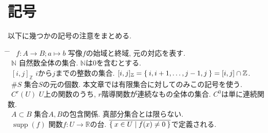 \documentclass{jsarticle}
\newcommand\setN{\mathbb{N}}
\newcommand\setZ{\mathbb{Z}}
\newcommand\setR{\mathbb{R}}
\newcommand\Cl[1]{\overline{#1}}
\newcommand\squa[1]{[#1]}
\newcommand\Squa[1]{\left[#1\right]}
\newcommand\Z[2]{\squa{#1,#2}_\mathbb{Z}}
\DeclareMathOperator{\supp}{supp}
\theoremstyle{definition}%
\begin{document}

\section*{記号}
以下に幾つかの記号の注意をまとめる.
\begin{tabbing}
    \hspace{5.2mm} \= \hspace{35mm} \= \hspace{1000mm} \kill
    \>  \, $f:A\to B;a\mapsto b$ \> 写像$f$の始域と終域, 元の対応を表す. \\
    \>  \, $\setN$ \> 自然数全体の集合. $\setN$は$0$を含むとする. \\
    \>  \, $\Z{i}{j}$ \> $i$から$j$までの整数の集合. $\Z{i}{j}=\Set{i,i+1,\dots,j-1,j}=\Squa{i,j}\cap\setZ$. \\
    \>  \, $\#S$ \> 集合$S$の元の個数. 本文章では有限集合に対してのみこの記号を使う. \\
    \>  \, $C^{r}(U)$ \> $U$上の関数のうち, $r$階導関数が連続なもの全体の集合. $C^0$は単に連続関数. \\
    \>  \, $A\subset B$ \> 集合$A,B$の包含関係. 真部分集合とは限らない. \\
    \>  \, $\supp(f)$ \> 関数$f:U\to\setR$の台. $\Cl{\Set{x\in U|f(x)\neq 0}}$で定義される.
\end{tabbing}


\tableofcontents


\newpage
{}
\end{document}
